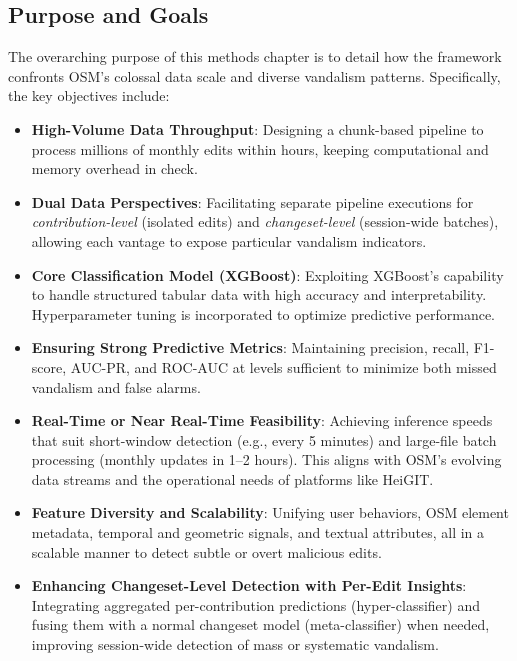 \documentclass[
    13pt, %
    a4paper, %
    listof=totoc, %
    bibliography=totoc, %
    index=totoc, %
    headsepline
]{scrreprt}
\begin{document}
\subsection{Purpose and Goals}
\label{sec:purpose_and_goals}

The overarching purpose of this methods chapter is to detail how the framework confronts OSM’s colossal data scale and diverse vandalism patterns. Specifically, the key objectives include:

\begin{itemize}
    \item \textbf{High-Volume Data Throughput}: 
    Designing a chunk-based pipeline to process millions of monthly edits within hours, keeping computational and memory overhead in check.
    \item \textbf{Dual Data Perspectives}: 
    Facilitating separate pipeline executions for \emph{contribution-level} (isolated edits) and \emph{changeset-level} (session-wide batches), allowing each vantage to expose particular vandalism indicators.
    \item \textbf{Core Classification Model (XGBoost)}: 
    Exploiting XGBoost’s capability to handle structured tabular data with high accuracy and interpretability. Hyperparameter tuning is incorporated to optimize predictive performance.
    \item \textbf{Ensuring Strong Predictive Metrics}: 
    Maintaining precision, recall, F1-score, AUC-PR, and ROC-AUC at levels sufficient to minimize both missed vandalism and false alarms.
    \item \textbf{Real-Time or Near Real-Time Feasibility}: 
    Achieving inference speeds that suit short-window detection (e.g., every 5 minutes) and large-file batch processing (monthly updates in 1--2 hours). This aligns with OSM’s evolving data streams and the operational needs of platforms like HeiGIT.
    \item \textbf{Feature Diversity and Scalability}: 
    Unifying user behaviors, OSM element metadata, temporal and geometric signals, and textual attributes, all in a scalable manner to detect subtle or overt malicious edits.
    \item \textbf{Enhancing Changeset-Level Detection with Per-Edit Insights}: 
    Integrating aggregated per-contribution predictions (hyper-classifier) and fusing them with a normal changeset model (meta-classifier) when needed, improving session-wide detection of mass or systematic vandalism.
\end{itemize}
\end{document}
